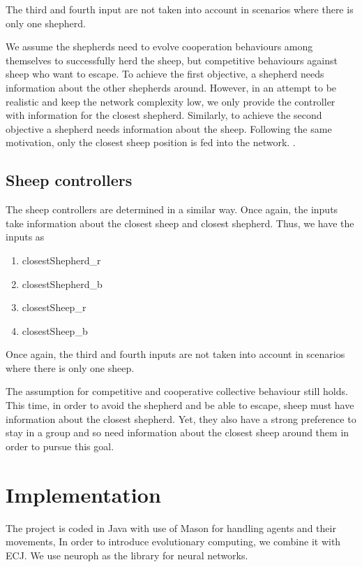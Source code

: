 \documentclass[conference]{IEEEtran}
\begin{document}
The third and fourth input are not taken into account in scenarios where there is only one shepherd. 

We assume the shepherds need to evolve cooperation behaviours among themselves to successfully herd the sheep, but competitive behaviours against sheep who want to escape. To achieve the first objective, a shepherd needs information about the other shepherds around. However, in an attempt to be realistic and keep the network complexity low, we only provide the controller with information for the closest shepherd. Similarly, to achieve the second objective a shepherd needs information about the sheep. Following the same motivation, only the closest sheep position is fed into the network. 
. 

\subsection{Sheep controllers}
The sheep controllers are determined in a similar way. Once again, the inputs take information about the closest sheep and closest shepherd. Thus, we have the inputs as 
\begin{enumerate}
	\item closestShepherd\_r
	\item closestShepherd\_b
	\item closestSheep\_r
	\item closestSheep\_b
\end{enumerate}



Once again, the third and fourth inputs are not taken into account in scenarios where there is only one sheep. 

The assumption for competitive and cooperative collective behaviour still holds. This time, in order to avoid the shepherd and be able to escape, sheep must have information about the closest shepherd. Yet, they also have a strong preference to stay in a group and so need information about the closest sheep around them in order to pursue this goal. 



\section{Implementation}
The project is coded in Java with use of Mason for handling agents and their movements, In order to introduce evolutionary computing, we combine it with ECJ. We use neuroph as the library for neural networks. 
\end{document}
